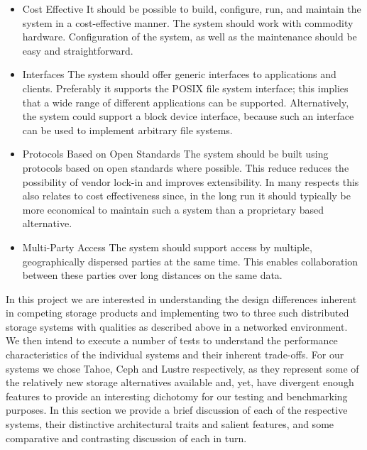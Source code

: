 \documentclass[11pt]{article}
\begin{document}
\begin{itemize}
\item Cost Effective It should be possible to build, configure, run, and 
maintain the system in a cost-effective manner. The system should work with 
commodity hardware. Configuration of the system, as well as the maintenance 
should be easy and straightforward. 

\item Interfaces The system should offer generic interfaces to applications 
and clients. Preferably it supports the POSIX file system interface; this 
implies that a wide range of different applications can be supported.  
Alternatively, the system could support a block device interface, because 
such an interface can be used to implement arbitrary file systems.

\item Protocols Based on Open Standards The system should be built using 
protocols based on open standards where possible. This reduce reduces the 
possibility of vendor lock-in and improves extensibility. In many respects 
this also relates to cost effectiveness since, in the long run it should 
typically be more economical to maintain such a system than a proprietary 
based alternative.

\item Multi-Party Access The system should support access by multiple, 
geographically dispersed parties at the same time. This enables 
collaboration between these parties over long distances on the same data.

\end{itemize}

In this project we are interested in understanding the design differences 
inherent in competing storage products and implementing two to three such 
distributed storage systems with qualities as described above in a 
networked environment. We then intend to execute a number of tests to 
understand the performance characteristics of the individual 
systems and their inherent trade-offs. For our systems we chose Tahoe, 
Ceph and Lustre respectively, as they represent some of the relatively 
new storage alternatives available and, yet, have divergent enough 
features to provide an interesting dichotomy for our testing and 
benchmarking purposes. In this section we provide a brief discussion 
of each of the respective systems, their distinctive architectural traits 
and salient features, and some comparative and contrasting discussion of 
each in turn.  
\end{document}
